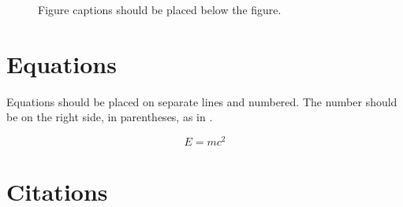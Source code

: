 \documentclass{article}
\begin{document}
\begin{figure}
 \centerline{}
 \caption{Figure captions should be placed below the figure.}
 \label{fig:example}
\end{figure}

\section{Equations}

Equations should be placed on separate lines and numbered.
The number should be on the right side, in parentheses, as in .

\begin{equation}\label{relativity}
E=mc^{2}
\end{equation}

\section{Citations}

%



%
%
%
%
\end{document}
